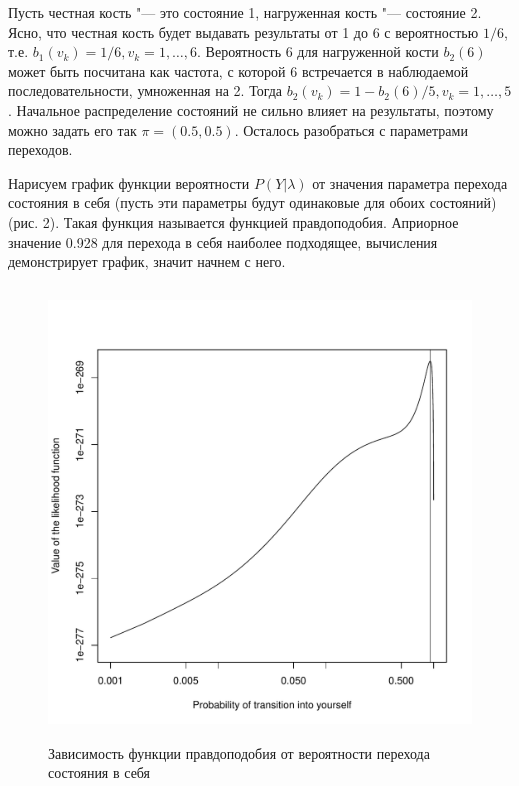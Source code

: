\documentclass[]{article}
\begin{document}
			Пусть честная кость "--- это состояние 1, нагруженная кость "--- состояние 2. Ясно, что честная кость будет выдавать результаты от 1 до 6 с вероятностью $1/6$, т.е. $b_{1}(v_{k}) = 1/6, v_{k}=1,\dots,6$. Вероятность 6 для нагруженной кости $b_{2}(6)$ может быть посчитана как частота, с которой 6 встречается в наблюдаемой последовательности, умноженная на 2. Тогда $b_{2}(v_{k}) = 1 - b_{2}(6)/5, v_{k}=1,\dots,5$. Начальное распределение состояний не сильно влияет на результаты, поэтому можно задать его так $\pi = (0.5, 0.5)$. Осталось разобраться с параметрами переходов. 
			
			Нарисуем график функции вероятности $P(Y|\lambda)$ от значения параметра перехода состояния в себя (пусть эти параметры будут одинаковые для обоих состояний) (рис. 2). Такая функция называется функцией правдоподобия. Априорное значение 0.928 для перехода в себя наиболее подходящее, вычисления демонстрирует график, значит начнем с него.
			
			\begin{figure}[h]
				\includegraphics[width=12cm, height=12cm]{Dependence of the likelihood function on transition probability log}
				\centering
				\caption{Зависимость функции правдоподобия от вероятности перехода состояния в себя}
			\end{figure}
			
\end{document}
